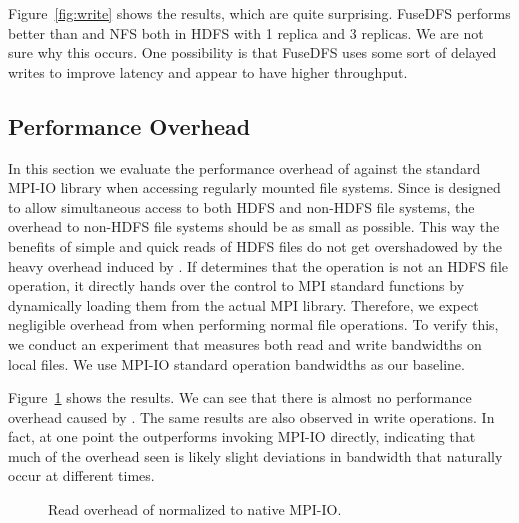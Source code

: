 Figure~\ref{fig:write} shows the results, which are quite surprising.
FuseDFS performs better than {\proj} and NFS both in HDFS with 1 replica and 3
replicas. We are not sure why this occurs. One possibility is that FuseDFS
uses some sort of delayed writes to improve latency and appear to have
higher throughput.

\subsection{Performance Overhead}
In this section we evaluate the performance overhead of {\proj} against the standard
MPI-IO library when accessing regularly mounted file systems. Since {\proj} is designed
to allow simultaneous access to both HDFS and non-HDFS file systems, the overhead to non-HDFS
file systems should be as small as possible. This way the benefits of simple and quick reads
of HDFS files do not get overshadowed by the heavy overhead induced by {\proj}.
If {\proj} determines that the operation is not an HDFS file operation, it directly hands over the control to
MPI standard functions by dynamically loading them from the actual MPI library. Therefore, we expect negligible
overhead from {\proj} when performing normal file operations. To verify this, we
conduct an experiment that measures both read and write bandwidths on local files. We use MPI-IO
standard operation bandwidths as our baseline. 

Figure~\ref{fig:over} shows the results. We can see that there is almost no
performance overhead caused by {\proj}. The same results are also observed in write
operations. In fact, at one point the {\proj} outperforms invoking MPI-IO directly,
indicating that much of the overhead seen is likely slight deviations in bandwidth
that naturally occur at different times.

\begin{figure}[t]
\begin{center}
\caption{\small Read overhead of {\proj} normalized to native MPI-IO.}
\label{fig:over}
\vspace{-6pt}
\end{center}
\end{figure}
